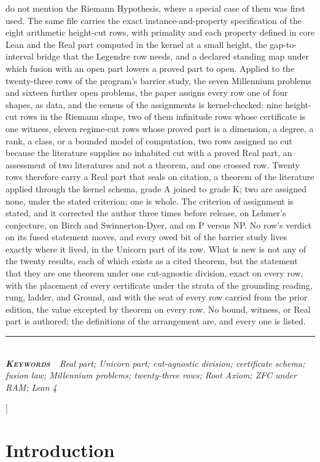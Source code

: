 \documentclass[10pt,twocolumn]{article}
\begin{document}
{\begin{minipage}{\textwidth}
{do not mention the Riemann Hypothesis, where a special case of them was
first used. The same file carries the exact instance-and-property
specification of the eight arithmetic height-cut rows, with primality
and each property defined in core Lean and the Real part computed in the
kernel at a small height, the gap-to-interval bridge that the Legendre
row needs, and a declared standing map under which fusion with an open
part lowers a proved part to open. Applied to the twenty-three rows of
the program's barrier study, the seven Millennium problems and sixteen
further open problems, the paper assigns every row one of four shapes,
as data, and the census of the assignments is kernel-checked: nine
height-cut rows in the Riemann shape, two of them infinitude rows whose
certificate is one witness, eleven regime-cut rows whose proved part is
a dimension, a degree, a rank, a class, or a bounded model of
computation, two rows assigned no cut because the literature supplies no
inhabited cut with a proved Real part, an assessment of two literatures
and not a theorem, and one crossed row. Twenty rows therefore carry a
Real part that seals on citation, a theorem of the literature applied
through the kernel schema, grade A joined to grade K; two are assigned
none, under the stated criterion; one is whole. The criterion of
assignment is stated, and it corrected the author three times before
release, on Lehmer's conjecture, on Birch and Swinnerton-Dyer, and on P
versus NP. No row's verdict on its fused statement moves, and every owed
bit of the barrier study lives exactly where it lived, in the Unicorn
part of its row. What is new is not any of the twenty results, each of
which exists as a cited theorem, but the statement that they are one
theorem under one cut-agnostic division, exact on every row, with the
placement of every certificate under the strata of the grounding
reading, rung, ladder, and Ground, and with the seat of every row
carried from the prior edition, the value excepted by theorem on every
row. No bound, witness, or Real part is authored; the definitions of the
arrangement are, and every one is listed.}\\[4pt]
{\color{accent}\rule{\textwidth}{0.6pt}}\\[3pt]
{\itshape\footnotesize\color{faint}\textbf{\upshape\scshape\color{deep}Keywords\ }\ Real
part; Unicorn part; cut-agnostic division; certificate schema; fusion
law; Millennium problems; twenty-three rows; Root Axiom; ZFC under RAM;
Lean 4}\\[12pt]
\end{minipage}
}]
\thispagestyle{fancy}
\hypertarget{introduction}{%
\section{Introduction}\label{introduction}}
\end{document}
